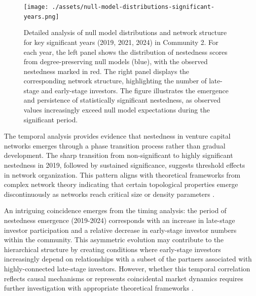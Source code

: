 \begin{figure}[htbp]
\centering
\texttt{[image: ./assets/null-model-distributions-significant-years.png]}
\caption{Detailed analysis of null model distributions and network structure for key significant years (2019, 2021, 2024) in Community 2. For each year, the left panel shows the distribution of nestedness scores from degree-preserving null models (blue), with the observed nestedness marked in red. The right panel displays the corresponding network structure, highlighting the number of late-stage and early-stage investors. The figure illustrates the emergence and persistence of statistically significant nestedness, as observed values increasingly exceed null model expectations during the significant period.}
\label{fig:null_model_distributions_significant_years}
\end{figure}

The temporal analysis provides evidence that nestedness in venture capital networks emerges through a phase transition process rather than gradual development. The sharp transition from non-significant to highly significant nestedness in 2019, followed by sustained significance, suggests threshold effects in network organization. This pattern aligns with theoretical frameworks from complex network theory indicating that certain topological properties emerge discontinuously as networks reach critical size or density parameters \cite{Mariani2019}.


An intriguing coincidence emerges from the timing analysis: the period of nestedness emergence (2019-2024) corresponds with an increase in late-stage investor participation and a relative decrease in early-stage investor numbers within the community. This asymmetric evolution may contribute to the hierarchical structure by creating conditions where early-stage investors increasingly depend on relationships with a subset of the partners associated with highly-connected late-stage investors. However, whether this temporal correlation reflects causal mechanisms or represents coincidental market dynamics requires further investigation with appropriate theoretical frameworks \cite{Dalle2025}.

